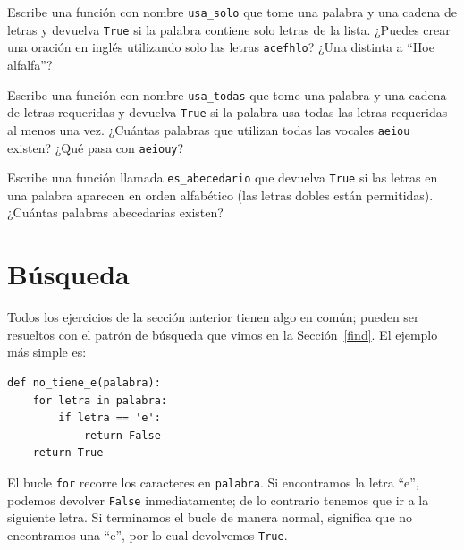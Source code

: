 \documentclass[10pt]{book}
\begin{document}
\begin{exercise}

Escribe una función con nombre \verb"usa_solo" que tome una palabra y una
cadena de letras y devuelva {\tt True} si la palabra contiene
solo letras de la lista.  ¿Puedes crear una oración en inglés utilizando solo las
letras {\tt acefhlo}?  ¿Una distinta a ``Hoe alfalfa''?

\end{exercise}


\begin{exercise}

Escribe una función con nombre \verb"usa_todas" que tome una palabra y una
cadena de letras requeridas y devuelva {\tt True} si la palabra
usa todas las letras requeridas al menos una vez.  ¿Cuántas palabras
que utilizan todas las vocales {\tt aeiou} existen?  ¿Qué pasa con {\tt aeiouy}?

\end{exercise}


\begin{exercise}

Escribe una función llamada \verb"es_abecedario" que devuelva
{\tt True} si las letras en una palabra aparecen en orden alfabético
(las letras dobles están permitidas).
¿Cuántas palabras abecedarias existen?


\end{exercise}



\section{Búsqueda}
\label{search}

Todos los ejercicios de la sección anterior tienen algo en
común; pueden ser resueltos con el patrón de búsqueda que vimos
en la Sección~\ref{find}.  El ejemplo más simple es:

\begin{verbatim}
def no_tiene_e(palabra):
    for letra in palabra:
        if letra == 'e':
            return False
    return True
\end{verbatim}
%
El bucle {\tt for} recorre los caracteres en {\tt palabra}.  Si encontramos
la letra ``e'', podemos devolver {\tt False} inmediatamente; de lo contrario
tenemos que ir a la siguiente letra.  Si terminamos el bucle de manera normal,
significa que no encontramos una ``e'', por lo cual devolvemos {\tt True}.
\end{document}
